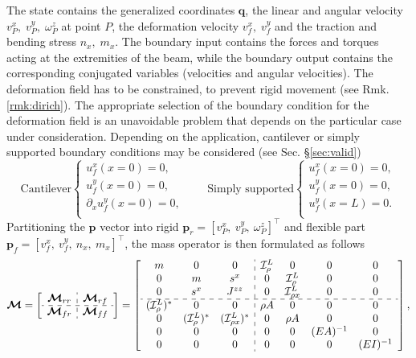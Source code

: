 \documentclass{svjour3}                     %
\newcommand{\secref}[1]{\S\ref{#1}}
\begin{document}
	The state contains the generalized coordinates $\bm{q}$, the linear and angular velocity $v_P^x, \; v_P^y, \; \omega_P^z$ at point $P$, the deformation velocity $ v_f^x, \; v_f^y$ and the traction and bending stress $n_x, \; m_{x}$. The boundary input contains the forces and torques acting at the extremities of the beam, while the boundary output contains the corresponding conjugated variables (velocities and angular velocities).
	The deformation field has to be constrained, to prevent rigid movement (see Rmk. \ref{rmk:dirich}). The appropriate selection of the boundary condition for the deformation field is an unavoidable problem that depends on the particular case under consideration.  Depending on the application, cantilever or simply supported boundary conditions may be considered (see Sec. \secref{sec:valid})
	\begin{equation*}
	\text{Cantilever}
	\begin{cases}
	u_f^x(x=0) = 0, \\
	u_f^y(x=0) = 0, \\
	\partial_x u_f^y(x=0) = 0, \\
	\end{cases} \qquad 
	\text{Simply supported}
	\begin{cases}
	u_f^x(x=0) = 0, \\
	u_f^y(x=0) = 0, \\
	u_f^y(x=L) = 0. \\
	\end{cases}
	\end{equation*}
	Partitioning the $\bm{p}$ vector into rigid $\bm{p}_r = [v_P^x, \ v_P^y, \ \omega_P^z]^\top$ and flexible part $\bm{p}_f = [v_f^x, \ v_f^y, \ n_x, \ m_{x}]^\top$, the mass operator is then formulated as follows
	\begin{equation}
	\label{eq:EB_M}
	\bm{\mathcal{M}} = 
	\left[ \begin{array}{c:c}
	\bm{\mathcal{M}}_{rr} & \bm{\mathcal{M}}_{rf} \\
	\hdashline
	\bm{\mathcal{M}}_{fr} & \bm{\mathcal{M}}_{ff} \\
	\end{array} \right] = 
	\left[ \begin{array}{ccc:cccc}
	m & 0 & 0 & \mathcal{I}_\rho^L & 0 & 0 & 0 \\
	0 & m & s^x & 0 & \mathcal{I}_\rho^L & 0 & 0 \\
	0 & s^x & J^{zz} & 0 & \mathcal{I}_{\rho x}^{L} & 0 & 0 \\
	\hdashline 
	(\mathcal{I}_\rho^{L})^* & 0 & 0 & \rho A & 0 & 0 & 0  \\
	0 & (\mathcal{I}_\rho^{L})^* & (\mathcal{I}_{\rho x}^{L})^* & 0 & \rho A & 0 & 0  \\
	0 & 0 & 0 & 0 & 0 & (EA)^{-1} & 0 \\
	0 & 0 & 0 & 0 & 0 & 0 & (EI)^{-1} \\
	\end{array} \right],
	\end{equation}
\end{document}
